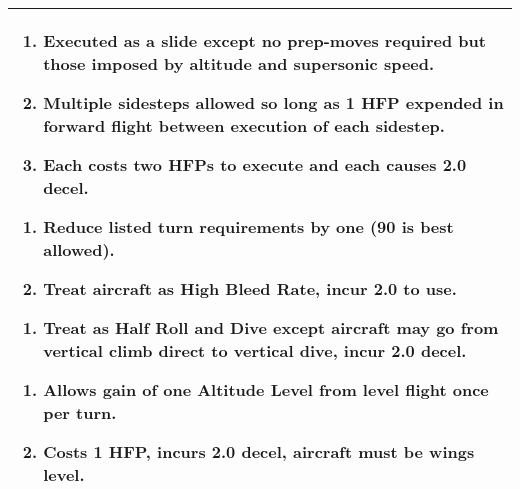 \begin{twocolumntable}
\begin{tabularx}{\linewidth}{P}
\begin{multicols}{2}


\begin{enumerate}[nosep]
    \item Executed as a slide except no prep-moves required but those imposed by altitude and supersonic speed.
    \item Multiple sidesteps allowed so long as 1 HFP expended in forward flight between execution of each sidestep.
    \item Each costs two HFPs to execute and each causes 2.0 decel.
\end{enumerate}


\begin{enumerate}[nosep]
    \item Reduce listed turn requirements by one (90 is best allowed).
    \item Treat aircraft as High Bleed Rate, incur 2.0 to use.
\end{enumerate}


\begin{enumerate}[nosep]
    \item Treat as Half Roll and Dive except aircraft may go from vertical climb direct to vertical dive, incur 2.0 decel.
\end{enumerate}


\begin{enumerate}[nosep]
    \item Allows gain of one Altitude Level from level flight once per turn.
    \item Costs 1 HFP, incurs 2.0 decel, aircraft must be wings level.
\end{enumerate}

\end{multicols}
\\
\bottomrule
\end{tabularx}
\end{twocolumntable}